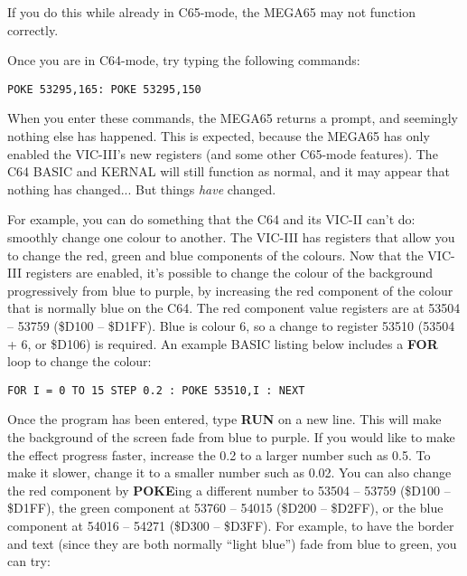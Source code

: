 If you do this while already in C65-mode, the MEGA65 may not function correctly.

Once you are in C64-mode, try typing the following commands:
\begin{tcolorbox}[colback=black,coltext=white]
\verbatimfont{\codefont}
\begin{verbatim}
POKE 53295,165: POKE 53295,150
\end{verbatim}
\end{tcolorbox}

When you enter these commands, the MEGA65 returns a  prompt, and seemingly nothing else has
happened.  This is expected, because the MEGA65 has only enabled the VIC-III's new registers (and some other
C65-mode features). The C64 BASIC and KERNAL will still function as normal, and it may appear
that nothing has changed... But things \textit{have} changed.

For example, you can do something that the C64 and its VIC-II can't do: smoothly change one colour to another.
The VIC-III has registers that allow you to change the red, green and blue components of the colours. Now that the VIC-III
registers are enabled, it's possible to change the colour of the background progressively from blue to purple, by increasing
the red component of the colour that is normally blue on the C64.  The red component value registers are at
53504 -- 53759 (\$D100 -- \$D1FF). Blue is colour 6, so a change to register 53510 (53504 + 6, or \$D106) is required.
An example BASIC listing below includes a {\bf FOR} loop to change the colour:

\begin{tcolorbox}[colback=black,coltext=white]
\verbatimfont{\codefont}
\begin{verbatim}
FOR I = 0 TO 15 STEP 0.2 : POKE 53510,I : NEXT
\end{verbatim}
\end{tcolorbox}

Once the program has been entered, type {\bf RUN} on a new line. This will make the background of the screen fade from
blue to purple.  If you would like to make the effect progress faster, increase the 0.2 to a larger number such as 0.5. To
make it slower, change it to a smaller number such as 0.02. You can also change the red component by {\bf POKE}ing a
different number to 53504 – 53759 (\$D100 – \$D1FF), the green component at 53760 -- 54015 (\$D200 -- \$D2FF), or the
blue component at 54016 -- 54271 (\$D300 -- \$D3FF).  For example, to have
the border and text (since they are both normally ``light blue'') fade from blue to green, you can try:

